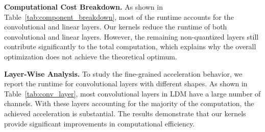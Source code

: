 % 

\textbf{Computational Cost Breakdown.} As shown in Table~\ref{tab:component_breakdown}, most of the runtime accounts for the convolutional and linear layers. Our kernels reduce the runtime of both convolutional and linear layers. However, the remaining non-quantized layers still contribute significantly to the total computation, which explains why the overall optimization does not achieve the theoretical optimum.





\textbf{Layer-Wise Analysis.} To study the fine-grained acceleration behavior, we report the runtime for convolutional layers with different shapes. As shown in Table~\ref{tab:conv_layer}, most convolutional layers in LDM have a large number of channels. With these layers accounting for the majority of the computation, the achieved acceleration is substantial. The results demonstrate that our kernels provide significant improvements in computational efficiency.



